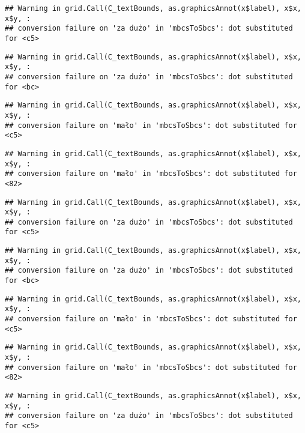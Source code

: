 \documentclass[
]{book}
\begin{document}
\begin{verbatim}
## Warning in grid.Call(C_textBounds, as.graphicsAnnot(x$label), x$x, x$y, :
## conversion failure on 'za dużo' in 'mbcsToSbcs': dot substituted for <c5>
\end{verbatim}

\begin{verbatim}
## Warning in grid.Call(C_textBounds, as.graphicsAnnot(x$label), x$x, x$y, :
## conversion failure on 'za dużo' in 'mbcsToSbcs': dot substituted for <bc>
\end{verbatim}

\begin{verbatim}
## Warning in grid.Call(C_textBounds, as.graphicsAnnot(x$label), x$x, x$y, :
## conversion failure on 'mało' in 'mbcsToSbcs': dot substituted for <c5>
\end{verbatim}

\begin{verbatim}
## Warning in grid.Call(C_textBounds, as.graphicsAnnot(x$label), x$x, x$y, :
## conversion failure on 'mało' in 'mbcsToSbcs': dot substituted for <82>
\end{verbatim}

\begin{verbatim}
## Warning in grid.Call(C_textBounds, as.graphicsAnnot(x$label), x$x, x$y, :
## conversion failure on 'za dużo' in 'mbcsToSbcs': dot substituted for <c5>
\end{verbatim}

\begin{verbatim}
## Warning in grid.Call(C_textBounds, as.graphicsAnnot(x$label), x$x, x$y, :
## conversion failure on 'za dużo' in 'mbcsToSbcs': dot substituted for <bc>
\end{verbatim}

\begin{verbatim}
## Warning in grid.Call(C_textBounds, as.graphicsAnnot(x$label), x$x, x$y, :
## conversion failure on 'mało' in 'mbcsToSbcs': dot substituted for <c5>
\end{verbatim}

\begin{verbatim}
## Warning in grid.Call(C_textBounds, as.graphicsAnnot(x$label), x$x, x$y, :
## conversion failure on 'mało' in 'mbcsToSbcs': dot substituted for <82>
\end{verbatim}

\begin{verbatim}
## Warning in grid.Call(C_textBounds, as.graphicsAnnot(x$label), x$x, x$y, :
## conversion failure on 'za dużo' in 'mbcsToSbcs': dot substituted for <c5>
\end{verbatim}
\end{document}
